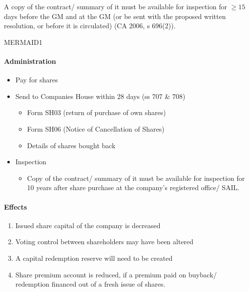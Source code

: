 \documentclass[
]{article}
\providecommand{\tightlist}{%
  \setlength{\itemsep}{0pt}\setlength{\parskip}{0pt}}
\begin{document}
A copy of the contract/ summary of it must be available for inspection
for \(\geq 15\) days before the GM and at the GM (or be sent with the
proposed written resolution, or before it is circulated) (CA 2006, s
696(2)).

MERMAID1

\hypertarget{administration}{%
\paragraph{Administration}\label{administration}}

\begin{itemize}
\tightlist
\item
  Pay for shares
\item
  Send to Companies House within 28 days (ss 707 \& 708)

  \begin{itemize}
  \tightlist
  \item
    Form SH03 (return of purchase of own shares)
  \item
    Form SH06 (Notice of Cancellation of Shares)
  \item
    Details of shares bought back
  \end{itemize}
\item
  Inspection

  \begin{itemize}
  \tightlist
  \item
    Copy of the contract/ summary of it must be available for inspection
    for 10 years after share purchase at the company's registered
    office/ SAIL.
  \end{itemize}
\end{itemize}

\hypertarget{effects}{%
\paragraph{Effects}\label{effects}}

\begin{enumerate}
\def\labelenumi{\arabic{enumi}.}
\tightlist
\item
  Issued share capital of the company is decreased
\item
  Voting control between shareholders may have been altered
\item
  A capital redemption reserve will need to be created
\item
  Share premium account is reduced, if a premium paid on buyback/
  redemption financed out of a fresh issue of shares.
\end{enumerate}
\end{document}
